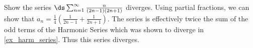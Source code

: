 {Show the series $\ds \sum_{n=1}^\infty \frac{n}{(2n-1)(2n+1)}$ diverges.
}
{Using partial fractions, we can show that $a_n = \frac14\left(\frac1{2n-1}+\frac{1}{2n+1}\right)$. The series is effectively twice the sum of the odd terms of the Harmonic Series which was shown to diverge in \autoref{ex_harm_series}. Thus this series diverges.
}
